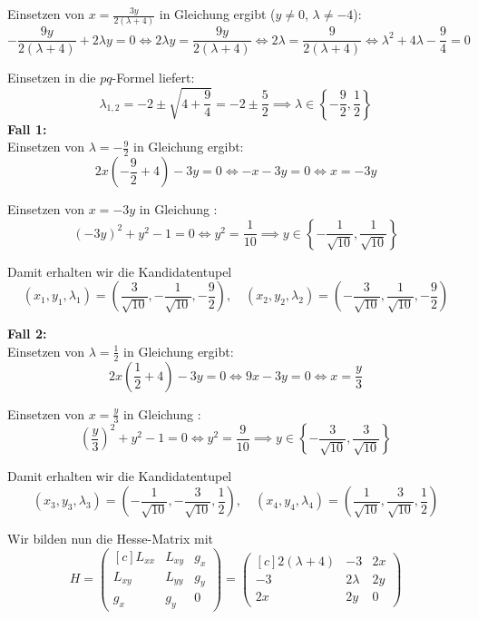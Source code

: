 \documentclass[answers]{exam}
\newcommand{\Rnum}[1]{\uppercase\expandafter{\romannumeral #1\relax}}
\newcommand{\vektor}[1]{\begin{pmatrix*}[c] #1 \end{pmatrix*}}
\begin{document}
\begin{questions}
\begin{solution}
        Einsetzen von $x = \frac{3y}{2(\lambda + 4)}$ in Gleichung \Rnum{2} ergibt ($y \neq 0$, $\lambda \neq -4$):
        $$
            -\frac{9y}{2(\lambda + 4)} + 2\lambda y = 0 \iff 2\lambda y = \frac{9y}{2(\lambda + 4)} \iff 2\lambda = \frac{9}{2(\lambda  + 4)} \iff \lambda^2 + 4\lambda -\frac{9}{4} = 0
        $$

        Einsetzen in die $pq$-Formel liefert:
        $$
            \lambda_{1, 2} = -2 \pm \sqrt{4 + \frac{9}{4}} = -2 \pm \frac{5}{2} \implies \lambda \in \left\{-\frac{9}{2}, \frac{1}{2}\right\}
        $$
        \newpage
        \textbf{Fall 1:}\\
        Einsetzen von $\lambda = -\frac{9}{2}$ in Gleichung \Rnum{1} ergibt:
        $$
            2x \left(-\frac{9}{2} + 4\right) - 3y = 0 \iff -x -3y = 0 \iff x = -3y
        $$

        Einsetzen von $x = -3y$ in Gleichung \Rnum{3}:
        $$
            (-3y)^2 + y^2 - 1 = 0 \iff y^2 = \frac{1}{10} \implies y \in \left\{ -\frac{1}{\sqrt{10}}, \frac{1}{\sqrt{10}} \right\}
        $$

        Damit erhalten wir die Kandidatentupel
        $$
            (x_1, y_1, \lambda_1) = \left(\frac{3}{\sqrt{10}}, -\frac{1}{\sqrt{10}}, -\frac{9}{2}\right), \quad (x_2, y_2, \lambda_2) = \left(-\frac{3}{\sqrt{10}}, \frac{1}{\sqrt{10}}, -\frac{9}{2}\right)
        $$

        \textbf{Fall 2:}\\
        Einsetzen von $\lambda = \frac{1}{2}$ in Gleichung \Rnum{1} ergibt:
        $$
            2x \left(\frac{1}{2} + 4\right) - 3y = 0 \iff 9x -3y = 0 \iff x = \frac{y}{3}
        $$

        Einsetzen von $x = \frac{y}{3}$ in Gleichung \Rnum{3}:
        $$
            \left(\frac{y}{3}\right)^2 + y^2 - 1 = 0 \iff y^2 = \frac{9}{10} \implies y \in \left\{ -\frac{3}{\sqrt{10}}, \frac{3}{\sqrt{10}} \right\}
        $$

        Damit erhalten wir die Kandidatentupel
        $$
            (x_3, y_3, \lambda_3) = \left(-\frac{1}{\sqrt{10}}, -\frac{3}{\sqrt{10}}, \frac{1}{2}\right), \quad (x_4, y_4, \lambda_4) = \left(\frac{1}{\sqrt{10}}, \frac{3}{\sqrt{10}}, \frac{1}{2}\right)
        $$

        Wir bilden nun die Hesse-Matrix mit
        $$
            H = \vektor{L_{xx} & L_{xy} & g_x \\ L_{xy} & L_{yy} & g_y \\ g_x & g_y & 0} = \vektor{2(\lambda + 4) & -3 & 2x \\ -3 & 2\lambda & 2y \\ 2x & 2y & 0}
        $$


\end{solution}
\end{questions}
\end{document}

